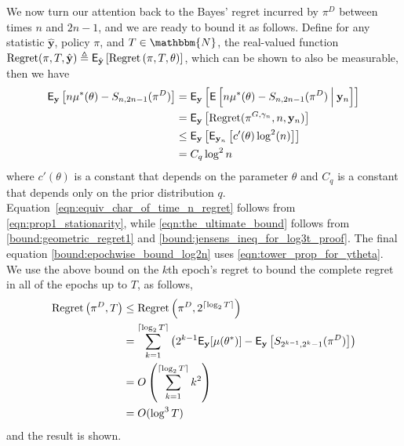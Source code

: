 \begin{myproof}[Proof.]
	We now turn our attention back to the Bayes' regret incurred by $\pi^D$ between times $n$ and $2n-1$, and we are ready to bound it as follows. Define for any statistic $\hat{ \mathbf y}$, policy $\pi$, and $T \in \mathbbm{N}$, the real-valued function $\text{Regret}(\pi, T, \hat {\mathbf{y}}) \defeq \E_{\hat{\mathbf{y}}}\left[\Regret{\pi, T, \theta}\right]$, which can be shown to also be measurable, then we have
	\begin{align}
		\E_{\mathbf y} \left[n \mu^*(\theta) - S_{n,2n-1}(\pi^D)\right] & = \E_{\mathbf y} \left[\E\left[n \mu^*(\theta) - S_{n,2n-1}(\pi^D) \given[\Big] {\mathbf y_n} \right]\right] \nonumber \\
		& = \E_{\mathbf y} \left[\text{Regret}(\pi^{G,\gamma_n}, n,  {\mathbf{y}_n}) \right] \label{eqn:equiv_char_of_time_n_regret} \\
		& \le \E_{\mathbf y} \left[\E_{\mathbf y_n}\left[  c'(\theta)  \log^2 (n) \right] \right]\label{eqn:the_ultimate_bound}  \\
		& = C_q \log^2n  \label{bound:epochwise_bound_log2n}
	\end{align}
	where $c'(\theta)$ is a constant that depends on the parameter $\theta$ and $C_q$ is a constant that depends only on the prior distribution $q$. Equation~\eqref{eqn:equiv_char_of_time_n_regret} follows from \eqref{eqn:prop1_stationarity}, while \eqref{eqn:the_ultimate_bound} follows from \eqref{bound:geometric_regret1} and \eqref{bound:jensens_ineq_for_log3t_proof}. The final equation \eqref{bound:epochwise_bound_log2n} uses \eqref{eqn:tower_prop_for_ytheta}. We use the above bound on the $k$th epoch's regret to bound the complete regret in all of the epochs up to $T$, as follows,
	\begin{align*}
	\Regret{\pi^D, T} & \le \Regret{\pi^D, 2^{\ceil{\log_2 T}}}\\
	& = \sum_{k=1}^{\ceil{\log_2 T}}\left(2^{k-1}\E_{\mathbf{y}}[\mu(\theta^*)] - \E_{\mathbf y}\left[ S_{2^{k-1}, 2^{k}-1}(\pi^D)\right]\right) \nonumber \\
	& =  O\left(\sum_{k=1}^{\ceil{\log_2 T}} k^2 \right)\label{eq:order_optimal_bayes} \\
	& = O(\log^3 T) \nonumber
	\end{align*}
	and the result is shown.
\end{myproof}

